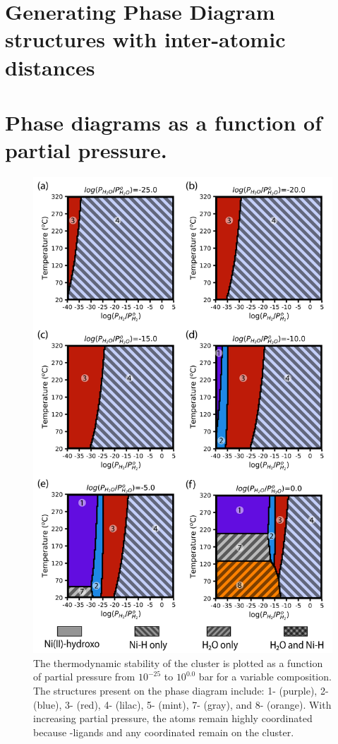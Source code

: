 \documentclass[12pt]{article}
\begin{document}
\newpage
\section{Generating Phase Diagram structures with inter-atomic distances}


\newpage
\section{Phase diagrams as a function of  partial pressure.}
\begin{figure}[H]
    \centering
    \includegraphics[width=0.60\linewidth]{zi-images/04-SI-images/2021-05-04-Trans-Ni.png}
    \caption{
    The thermodynamic stability of the cluster is plotted as a function of  partial pressure from $10^{-25}$ to $10^{0.0}$ bar for a variable  composition. The structures present on the phase diagram include:
        1- (purple),               %
        2- (blue),                 %
        3- (red),                  %
        4- (lilac),                 %
        5- (mint),                  %
        7- (gray), and         %
        8- (orange).          %
    With increasing  partial pressure, the  atoms remain highly coordinated because -ligands and any coordinated  remain on the cluster.  
    }
    \label{fig:SI-phase-Ni-trans}
\end{figure}
\end{document}
